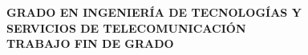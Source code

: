 \pagestyle{empty}

\vspace*{5.5cm}

\begin{center}
    {\Large\rm \textbf{ GRADO EN INGENIERÍA DE TECNOLOGÍAS Y\\
    SERVICIOS DE TELECOMUNICACIÓN\\}}
    \vspace{2.0cm}
    {\Large\rm \textbf{TRABAJO FIN DE GRADO}} \\
    \vspace{4cm}
    {\Large\rm\textbf{\MakeUppercase{\tfgtitlees}}}
    \vfill
    {\Large\rm\textbf{\MakeUppercase{\authorname}}} \\
    {\Large \textbf{\MakeUppercase{\fecha}}}
    \vspace{1.0cm}
\end{center}

